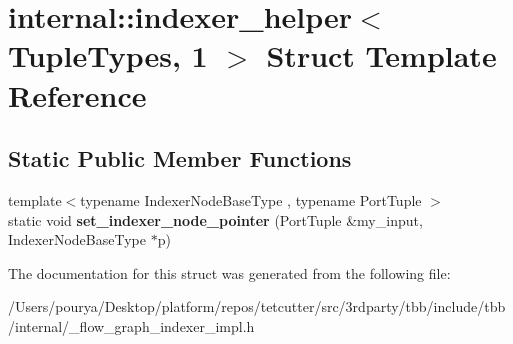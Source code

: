 \hypertarget{structinternal_1_1indexer__helper_3_01TupleTypes_00_011_01_4}{}\section{internal\+:\+:indexer\+\_\+helper$<$ Tuple\+Types, 1 $>$ Struct Template Reference}
\label{structinternal_1_1indexer__helper_3_01TupleTypes_00_011_01_4}
\subsection*{Static Public Member Functions}
\begin{DoxyCompactItemize}
\item 
\hypertarget{structinternal_1_1indexer__helper_3_01TupleTypes_00_011_01_4_a361702e82c53a0b3abe10cdec7b043b1}{}{\footnotesize template$<$typename Indexer\+Node\+Base\+Type , typename Port\+Tuple $>$ }\\static void {\bfseries set\+\_\+indexer\+\_\+node\+\_\+pointer} (Port\+Tuple \&my\+\_\+input, Indexer\+Node\+Base\+Type $\ast$p)\label{structinternal_1_1indexer__helper_3_01TupleTypes_00_011_01_4_a361702e82c53a0b3abe10cdec7b043b1}

\end{DoxyCompactItemize}


The documentation for this struct was generated from the following file\+:\begin{DoxyCompactItemize}
\item 
/\+Users/pourya/\+Desktop/platform/repos/tetcutter/src/3rdparty/tbb/include/tbb/internal/\+\_\+flow\+\_\+graph\+\_\+indexer\+\_\+impl.\+h\end{DoxyCompactItemize}

